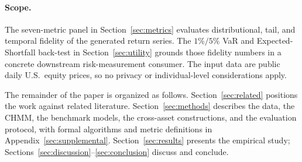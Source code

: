 \paragraph{Scope.}
The seven-metric panel in Section~\ref{sec:metrics} evaluates distributional, tail, and temporal fidelity of the generated return series.
The $1\%/5\%$ VaR and Expected-Shortfall back-test in Section~\ref{sec:utility} grounds those fidelity numbers in a concrete downstream risk-measurement consumer.
The input data are public daily U.S.\ equity prices, so no privacy or individual-level considerations apply.

The remainder of the paper is organized as follows.
Section~\ref{sec:related} positions the work against related literature.
Section~\ref{sec:methods} describes the data, the CHMM, the benchmark models, the cross-asset constructions, and the evaluation protocol, with formal algorithms and metric definitions in Appendix~\ref{sec:supplemental}.
Section~\ref{sec:results} presents the empirical study; Sections~\ref{sec:discussion}--\ref{sec:conclusion} discuss and conclude.

